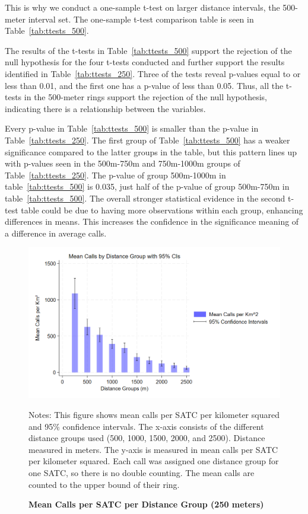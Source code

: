 \documentclass[12pt]{article}
\begin{document}
This is why we conduct a one-sample t-test on larger distance intervals, the 500-meter interval set. The one-sample t-test comparison table is seen in Table~\ref{tab:ttests_500}. 

The results of the t-tests in Table~\ref{tab:ttests_500} support the rejection of the null hypothesis for the four t-tests conducted and further support the results identified in Table~\ref{tab:ttests_250}. Three of the tests reveal p-values equal to or less than 0.01, and the first one has a p-value of less than 0.05. Thus, all the t-tests in the 500-meter rings support the rejection of the null hypothesis, indicating there is a relationship between the variables. 

Every p-value in Table~\ref{tab:ttests_500} is smaller than the p-value in Table~\ref{tab:ttests_250}. The first group of Table~\ref{tab:ttests_500} has a weaker significance compared to the latter groups in the table, but this pattern lines up with p-values seen in the 500m-750m and 750m-1000m groups of Table~\ref{tab:ttests_250}. The p-value of group 500m-1000m in table~\ref{tab:ttests_500} is 0.035, just half of the p-value of group 500m-750m in table~\ref{tab:ttests_500}. The overall stronger statistical evidence in the second t-test table could be due to having more observations within each group, enhancing differences in means. This increases the confidence in the significance meaning of a difference in average calls.

\begin{figure}[H]
    \centering
\includegraphics[width=0.75\linewidth]{Reproducibility Package/Downloaded_calls/Visual_Graphics_Downloaded_calls/250_CI_Graph.png}
    \caption{\textbf{Mean Calls per SATC per Distance Group (250 meters)}}
     \label{fig:Figure3}
    \centering\small{Notes: This figure shows mean calls per SATC per kilometer squared and 95\% confidence intervals. The x-axis consists of the different distance groups used (500, 1000, 1500, 2000, and 2500). Distance measured in meters. The y-axis is measured in mean calls per SATC per kilometer squared. Each call was assigned one distance group for one SATC, so there is no double counting. The mean calls are counted to the upper bound of their ring.}
\end{figure}
\end{document}
